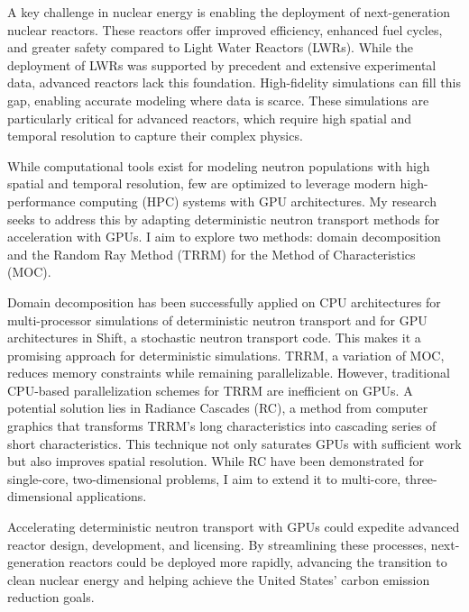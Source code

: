 \documentclass[12pt]{letter}
\begin{document}
A key challenge in nuclear energy is enabling the deployment of next-generation nuclear reactors. These reactors offer improved efficiency, enhanced fuel cycles, and greater safety compared to Light Water Reactors (LWRs). While the deployment of LWRs was supported by precedent and extensive experimental data, advanced reactors lack this foundation. High-fidelity simulations can fill this gap, enabling accurate modeling where data is scarce. These simulations are particularly critical for advanced reactors, which require high spatial and temporal resolution to capture their complex physics.

While computational tools exist for modeling neutron populations with high spatial and temporal resolution, few are optimized to leverage modern high-performance computing (HPC) systems with GPU architectures. My research seeks to address this by adapting deterministic neutron transport methods for acceleration with GPUs. I aim to explore two methods: domain decomposition and the Random Ray Method (TRRM) for the Method of Characteristics (MOC).

Domain decomposition has been successfully applied on CPU architectures for multi-processor simulations of deterministic neutron transport and for GPU architectures in Shift, a stochastic neutron transport code. This makes it a promising approach for deterministic simulations. TRRM, a variation of MOC, reduces memory constraints while remaining parallelizable. However, traditional CPU-based parallelization schemes for TRRM are inefficient on GPUs. A potential solution lies in Radiance Cascades (RC), a method from computer graphics that transforms TRRM's long characteristics into cascading series of short characteristics. This technique not only saturates GPUs with sufficient work but also improves spatial resolution. While RC have been demonstrated for single-core, two-dimensional problems, I aim to extend it to multi-core, three-dimensional applications.

Accelerating deterministic neutron transport with GPUs could expedite advanced reactor design, development, and licensing. By streamlining these processes, next-generation reactors could be deployed more rapidly, advancing the transition to clean nuclear energy and helping achieve the United States’ carbon emission reduction goals.
\end{document}
